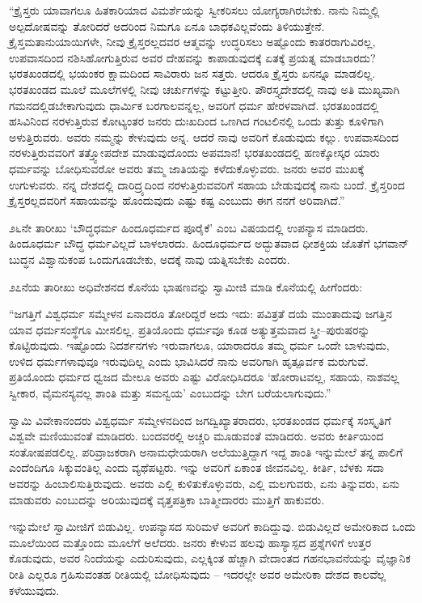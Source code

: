  “ಕ್ರೈಸ್ತರು ಯಾವಾಗಲೂ ಹಿತಕಾರಿಯಾದ ವಿಮರ್ಶೆಯನ್ನು ಸ್ವೀಕರಿಸಲು ಯೋಗ್ಯರಾಗಿರಬೇಕು. ನಾನು ನಿಮ್ಮಲ್ಲಿ ಅಲ್ಪದೋಷವನ್ನು ತೋರಿದರೆ ಅದರಿಂದ ನಿಮಗೂ ಏನೂ ಬಾಧಕವಿಲ್ಲವೆಂದು ತಿಳಿಯುತ್ತೇನೆ. ಕ್ರೈಸ್ತಮತಾನುಯಾಯಿಗಳೇ, ನೀವು ಕ್ರೈಸ್ತರಲ್ಲದವರ ಆತ್ಮವನ್ನು ಉದ್ಧರಿಸಲು ಅಷ್ಟೊಂದು ಕಾತರರಾಗುವಿರಲ್ಲ, ಉಪವಾಸದಿಂದ ನಶಿಸಿಹೋಗುತ್ತಿರುವ ಅವರ ದೇಹವನ್ನು ಕಾಪಾಡುವುದಕ್ಕೆ ಏತಕ್ಕೆ ಪ್ರಯತ್ನ ಮಾಡಬಾರದು? ಭರತಖಂಡದಲ್ಲಿ ಭಯಂಕರ ಕ್ಷಾಮದಿಂದ ಸಾವಿರಾರು ಜನ ಸತ್ತರು. ಆದರೂ ಕ್ರೈಸ್ತರು ಏನನ್ನೂ ಮಾಡಲಿಲ್ಲ. ಭರತಖಂಡದ ಮೂಲೆ ಮೂಲೆಗಳಲ್ಲಿ ನೀವು ಚರ್ಚುಗಳನ್ನು ಕಟ್ಟುತ್ತೀರಿ. ಪೌರಸ್ತ್ಯದೇಶದಲ್ಲಿ ನಾವು ಅತಿ ಮುಖ್ಯವಾಗಿ ಗಮನದಲ್ಲಿಡಬೇಕಾಗುವುದು ಧಾರ್ಮಿಕ ಬರಗಾಲವನ್ನಲ್ಲ, ಅವರಿಗೆ ಧರ್ಮ ಹೇರಳವಾಗಿದೆ. ಭರತಖಂಡದಲ್ಲಿ ಹಸಿವಿನಿಂದ ನರಳುತ್ತಿರುವ ಕೋಟ್ಯಂತರ ಜನರು ದುಃಖದಿಂದ ಒಣಗಿದ ಗಂಟಲಿನಲ್ಲಿ ಒಂದು ತುತ್ತು ಕೂಳಿಗಾಗಿ ಅಳುತ್ತಿರುವರು. ಅವರು ನಮ್ಮನ್ನು ಕೇಳುವುದು ಅನ್ನ. ಆದರೆ ನಾವು ಅವರಿಗೆ ಕೊಡುವುದು ಕಲ್ಲು. ಉಪವಾಸದಿಂದ ನರಳುತ್ತಿರುವವರಿಗೆ ತತ್ತ್ವೋಪದೇಶ ಮಾಡುವುದೊಂದು ಅಪಮಾನ! ಭರತಖಂಡದಲ್ಲಿ ಹಣಕ್ಕೋಸ್ಕರ ಯಾರು ಧರ್ಮವನ್ನು ಬೋಧಿಸುವರೋ ಅವರು ತಮ್ಮ ಜಾತಿಯನ್ನು ಕಳೆದುಕೊಳ್ಳುವರು. ಜನರು ಅವರ ಮುಖಕ್ಕೆ ಉಗುಳುವರು. ನನ್ನ ದೇಶದಲ್ಲಿ ದಾರಿದ್ರ್ಯದಿಂದ ನರಳುತ್ತಿರುವವರಿಗೆ ಸಹಾಯ ಬೇಡುವುದಕ್ಕೆ ನಾನು ಬಂದೆ. ಕ್ರೈಸ್ತರಿಂದ ಕ್ರೈಸ್ತರಲ್ಲದವರಿಗೆ ಸಹಾಯವನ್ನು ಹೊಂದುವುದು ಎಷ್ಟು ಕಷ್ಟ ಎಂಬುದು ಈಗ ನನಗೆ ಅರಿವಾಗಿದೆ.” 

 ೨೬ನೇ ತಾರೀಖು ‘ಬೌದ್ಧಧರ್ಮ ಹಿಂದೂಧರ್ಮದ ಪೂರೈಕೆ’ ಎಂಬ ವಿಷಯದಲ್ಲಿ ಉಪನ್ಯಾಸ ಮಾಡಿದರು. ಹಿಂದೂಧರ್ಮ ಬೌದ್ಧ ಧರ್ಮವಿಲ್ಲದೆ ಬಾಳಲಾರದು. ಹಿಂದೂಧರ್ಮದ ಅದ್ಭುತವಾದ ಧೀಶಕ್ತಿಯ ಜೊತೆಗೆ ಭಗವಾನ್ ಬುದ್ಧನ ವಿಶ್ವಾನುಕಂಪ ಒಂದುಗೂಡಬೇಕು, ಅದಕ್ಕೆ ನಾವು ಯತ್ನಿಸಬೇಕು ಎಂದರು. 

 ೨೭ನೆಯ ತಾರೀಖು ಅಧಿವೇಶನದ ಕೊನೆಯ ಭಾಷಣವನ್ನು ಸ್ವಾಮೀಜಿ ಮಾಡಿ ಕೊನೆಯಲ್ಲಿ ಹೀಗೆಂದರು: 

 “ಜಗತ್ತಿಗೆ ವಿಶ್ವಧರ್ಮ ಸಮ್ಮೇಳನ ಏನಾದರೂ ತೋರಿದ್ದರೆ ಅದು ಇದು: ಪವಿತ್ರತೆ ದಯೆ ಮುಂತಾದುವು ಜಗತ್ತಿನ ಯಾವ ಧರ್ಮಸಂಸ್ಥೆಗೂ ಮೀಸಲಿಲ್ಲ. ಪ್ರತಿಯೊಂದು ಧರ್ಮವೂ ಕೂಡ ಅತ್ಯುತ್ತಮವಾದ ಸ್ತ್ರೀ–ಪುರುಷರನ್ನು ಕೊಟ್ಟಿರುವುದು. ಇಷ್ಟೊಂದು ನಿದರ್ಶನಗಳು ಇರುವಾಗಲೂ, ಯಾರಾದರೂ ತಮ್ಮ ಧರ್ಮ ಒಂದೇ ಬಾಳುವುದು, ಉಳಿದ ಧರ್ಮಗಳಾವುವೂ ಇರುವುದಿಲ್ಲ ಎಂದು ಭಾವಿಸಿದರೆ ನಾನು ಅವರಿಗಾಗಿ ಹೃತ್ಪೂರ್ವಕ ಮರುಗುವೆ. ಪ್ರತಿಯೊಂದು ಧರ್ಮದ ಧ್ವಜದ ಮೇಲೂ ಅವರು ಎಷ್ಟು ವಿರೋಧಿಸಿದರೂ ‘ಹೋರಾಟವಲ್ಲ, ಸಹಾಯ, ನಾಶವಲ್ಲ ಸ್ವೀಕಾರ, ವೈಮನಸ್ಯವಲ್ಲ ಶಾಂತಿ ಮತ್ತು ಸಮನ್ವಯ’ ಎಂಬುದನ್ನು ಬೇಗ ಬರೆಯಲಾಗುವುದು.” 

 ಸ್ವಾಮಿ ವಿವೇಕಾನಂದರು ವಿಶ್ವಧರ್ಮ ಸಮ್ಮೇಳನದಿಂದ ಜಗದ್ವಿಖ್ಯಾತರಾದರು, ಭರತಖಂಡದ ಧರ್ಮಕ್ಕೆ ಸಂಸ್ಕೃತಿಗೆ ವಿಶ್ವವೇ ಮಣಿಯುವಂತೆ ಮಾಡಿದರು. ಬಂದವರಲ್ಲಿ ಅಚ್ಚರಿ ಮೂಡುವಂತೆ ಮಾಡಿದರು. ಅವರು ಕೀರ್ತಿಯಿಂದ ಸಂತೋಷಪಡಲಿಲ್ಲ. ಪರಿವ್ರಾಜಕರಾಗಿ ಅನಾಮಧೇಯರಾಗಿ ಅಲೆಯುತ್ತಿದ್ದಾಗ ಇದ್ದ ಶಾಂತಿ ಇನ್ನುಮೇಲೆ ತನ್ನ ಪಾಲಿಗೆ ಎಂದೆಂದಿಗೂ ಸಿಕ್ಕುವಂತಿಲ್ಲ ಎಂದು ವ್ಯಥೆಪಟ್ಟರು. ಇನ್ನು ಅವರಿಗೆ ಏಕಾಂತ ಜೀವನವಿಲ್ಲ. ಕೀರ್ತಿ, ಬೆಳಕು ಸದಾ ಅವರನ್ನು ಹಿಂಬಾಲಿಸುತ್ತಿರುವುದು. ಅವರು ಎಲ್ಲಿ ಕುಳಿತುಕೊಳ್ಳುವರು, ಎಲ್ಲಿ ಮಲಗುವರು, ಏನು ತಿನ್ನುವರು, ಏನು ಮಾಡುವರು ಎಂಬುದನ್ನು ಅರಿಯುವುದಕ್ಕೆ ವೃತ್ತಪತ್ರಿಕಾ ಬಾತ್ಮೀದಾರರು ಮುತ್ತಿಗೆ ಹಾಕುವರು. 

 ಇನ್ನುಮೇಲೆ ಸ್ವಾಮೀಜಿಗೆ ಬಿಡುವಿಲ್ಲ. ಉಪನ್ಯಾಸದ ಸುರಿಮಳೆ ಅವರಿಗೆ ಕಾದಿದ್ದುವು. ಬಿಡುವಿಲ್ಲದೆ ಅಮೇರಿಕಾದ ಒಂದು ಮೂಲೆಯಿಂದ ಮತ್ತೊಂದು ಮೂಲೆಗೆ ಅಲೆದರು. ಜನರು ಕೇಳುವ ಹಲವು ಹಾಸ್ಯಾಸ್ಪದ ಪ್ರಶ್ನೆಗಳಿಗೆ ಉತ್ತರ ಕೊಡುವುದು, ಅವರ ನಿಂದೆಯನ್ನು ಎದುರಿಸುವುದು, ಎಲ್ಲಕ್ಕಿಂತ ಹೆಚ್ಚಾಗಿ ವೇದಾಂತದ ಗಹನಭಾವನೆಯನ್ನು ವೈಜ್ಞಾನಿಕ ರೀತಿ ಎಲ್ಲರೂ ಗ್ರಹಿಸುವಂತಹ ರೀತಿಯಲ್ಲಿ ಬೋಧಿಸುವುದು – ಇದರಲ್ಲೇ ಅವರ ಅಮೇರಿಕಾ ದೇಶದ ಕಾಲವೆಲ್ಲ ಕಳೆಯುವುದು. 

